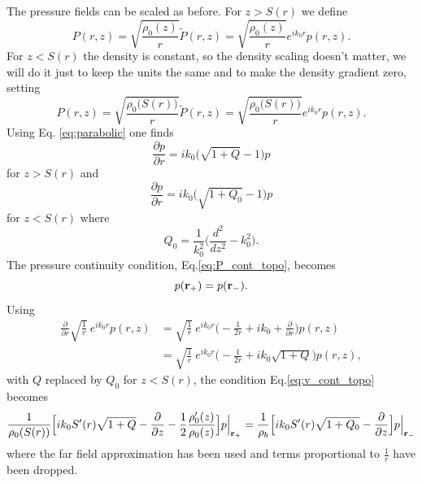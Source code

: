 The pressure fields can be scaled as before. For $z>S(r)$ we define 
\[
P(r,z)=\sqrt{\frac{\rho_0(z)}{r}}\tilde P(r,z)=\sqrt{\frac{\rho_0(z)}{r}}e^{ik_0r}p(r,z). 
\]
For $z<S(r)$ the density is constant, so the density scaling doesn't matter, we will do it just to keep the units the same and to make the density gradient zero, setting 
\[
P(r,z)=\sqrt{\frac{\rho_0\big(S(r)\big)}{r}}\tilde P(r,z)=\sqrt{\frac{\rho_0\big(S(r)\big)}{r}}e^{ik_0r}p(r,z). 
\]
Using Eq. \ref{eq:parabolic} one finds 
\[
\frac{\partial p}{\partial r}=ik_0\big(\sqrt{1+Q}-1\big)p
\]
for $z>S(r)$ and 
\[
\frac{\partial p}{\partial r}=ik_0\big(\sqrt{1+Q_0}-1\big)p
\]
for $z<S(r)$
where 
\[
Q_0=\frac{1}{k_0^2}\Big(\frac{d^2}{dz^2}-k_0^2\Big).
\]
The pressure continuity condition, Eq.\ref{eq:P_cont_topo}, becomes 
\[
p({\bf r}_+)=p({\bf r}_-).
\]
Using
\[
\begin{aligned}
\frac{\partial}{\partial r}\sqrt{\frac{1}{r}}\ e^{ik_0r}p(r,z)
&=
\sqrt{\frac{1}{r}}\ e^{ik_0r} \Big(-\frac{1}{2r}+ik_0+\frac{\partial}{\partial r}\Big)p(r,z)\\
&=
\sqrt{\frac{1}{r}}\ e^{ik_0r} \Big(-\frac{1}{2r}+ik_0\sqrt{1+Q}\Big)p(r,z),
\end{aligned}
\]
with $Q$ replaced by $Q_0$ for $z<S(r)$, the condition Eq.\ref{eq:v_cont_topo} becomes 
\begin{equation}
\frac{1}{\rho_0(S(r))}
\Big[ik_0S^\prime(r)\sqrt{1+Q}
-\frac{\partial}{\partial z}-\frac{1}{2}\frac{\rho_0^\prime(z)}{\rho_0(z)}\Big]p\Big|_{{\bf r}_+}
=
\frac{1}{\rho_b}\Big[ik_0S^\prime(r)\sqrt{1+Q_0}-\frac{\partial}{\partial z}
\Big]p\Big|_{{\bf r}_-}
\label{eq:interface_deriv_cond}\end{equation}
where the far field approximation has been used and terms proportional to $\frac{1}{r}$ have been dropped.  


